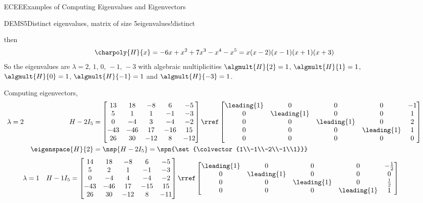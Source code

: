 \begin{subsect}{ECEE}{Examples of Computing Eigenvalues and Eigenvectors}
\begin{example}{DEMS5}{Distinct eigenvalues, matrix of size 5}{eigenvalues!distinct}
\begin{para}
\begin{equation*}
\end{equation*}
%
then
%
\begin{equation*}
\charpoly{H}{x}=-6x+x^2+7x^3-x^4-x^5=x(x-2)(x-1)(x+1)(x+3)
\end{equation*}
%
So the eigenvalues are $\lambda=2,\,1,\,0,\,-1,\,-3$ with algebraic multiplicities $\algmult{H}{2}=1$,  $\algmult{H}{1}=1$,  $\algmult{H}{0}=1$,  $\algmult{H}{-1}=1$ and $\algmult{H}{-3}=1$.\end{para}
%
\begin{para}Computing eigenvectors,
%
\begin{align*}
\lambda&=2&H-2I_5&=
\begin{bmatrix}
13 & 18 & -8 & 6 & -5\\
5 & 1 & 1 & -1 & -3\\
0 & -4 & 3 & -4 & -2\\
-43 & -46 & 17 & -16 & 15\\
26 & 30 & -12 & 8 & -12
\end{bmatrix}
\rref
\begin{bmatrix}
\leading{1} & 0 & 0 & 0 & -1\\
0 & \leading{1} & 0 & 0 & 1\\
0 & 0 & \leading{1} & 0 & 2\\
0 & 0 & 0 & \leading{1} & 1\\
0 & 0 & 0 & 0 & 0
\end{bmatrix}\\
&&\eigenspace{H}{2}&=\nsp{H-2I_5}
=\spn{\set{\colvector{1\\-1\\-2\\-1\\1}}}
\end{align*}
%
\begin{align*}
\lambda&=1&H-1I_5&=
\begin{bmatrix}
14 & 18 & -8 & 6 & -5\\
5 & 2 & 1 & -1 & -3\\
0 & -4 & 4 & -4 & -2\\
-43 & -46 & 17 & -15 & 15\\
26 & 30 & -12 & 8 & -11
\end{bmatrix}
\rref
\begin{bmatrix}
\leading{1} & 0 & 0 & 0 & -\frac{1}{2}\\
0 & \leading{1} & 0 & 0 & 0\\
0 & 0 & \leading{1} & 0 & \frac{1}{2}\\
0 & 0 & 0 & \leading{1} & 1\\

\end{bmatrix}
\end{align*}
\end{para}
\end{example}
\end{subsect}
